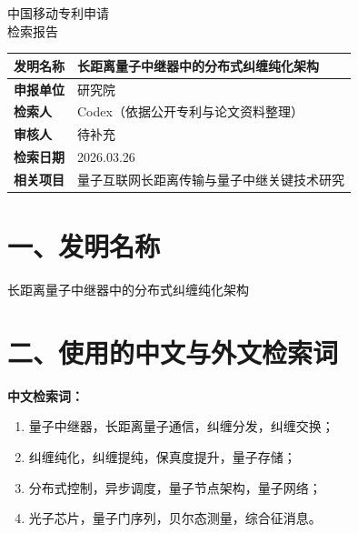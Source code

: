 \documentclass[12pt,a4paper]{article}
\begin{document}
\begin{center}
    {\Huge\heiti 中国移动专利申请} \\[0.5em]
    {\Huge\heiti 检索报告} \\[1em]
\end{center}

\begin{table}[h]
    \centering
    \renewcommand{\arraystretch}{1.8}
    \begin{tabular}{|p{3cm}|p{12cm}|}
        \hline
        \textbf{发明名称} & 长距离量子中继器中的分布式纠缠纯化架构 \\
        \hline
        \textbf{申报单位} & 研究院 \\
        \hline
        \textbf{检索人} & Codex（依据公开专利与论文资料整理） \\
        \hline
        \textbf{审核人} & 待补充 \\
        \hline
        \textbf{检索日期} & 2026.03.26 \\
        \hline
        \textbf{相关项目} & 量子互联网长距离传输与量子中继关键技术研究 \\
        \hline
    \end{tabular}
\end{table}

\noindent{}

\section*{一、发明名称}

长距离量子中继器中的分布式纠缠纯化架构

\section*{二、使用的中文与外文检索词}

\textbf{中文检索词：}
\begin{enumerate}[label=(\arabic*)]
    \item 量子中继器，长距离量子通信，纠缠分发，纠缠交换；
    \item 纠缠纯化，纠缠提纯，保真度提升，量子存储；
    \item 分布式控制，异步调度，量子节点架构，量子网络；
    \item 光子芯片，量子门序列，贝尔态测量，综合征消息。
\end{enumerate}
\end{document}

